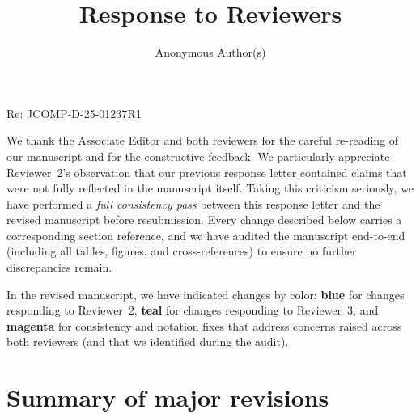 \documentclass{article}
\title{Response to Reviewers}
\author{Anonymous Author(s)}
\begin{document}
\maketitle

Re: JCOMP-D-25-01237R1

\medskip

We thank the Associate Editor and both reviewers for the careful re-reading of our manuscript and for the constructive feedback. We particularly appreciate Reviewer~2's observation that our previous response letter contained claims that were not fully reflected in the manuscript itself.
Taking this criticism seriously, we have performed a \emph{full consistency pass} between this response letter and the revised manuscript before resubmission. Every change described below carries a corresponding section reference, and we have audited the manuscript end-to-end (including all tables, figures, and cross-references) to ensure no further discrepancies remain.

In the revised manuscript, we have indicated changes by color:
{\color{blue}\textbf{blue}} for changes responding to Reviewer~2,
{\color{teal}\textbf{teal}} for changes responding to Reviewer~3, and
{\color{magenta}\textbf{magenta}} for consistency and notation fixes that
address concerns raised across both reviewers (and that we identified during
the audit).

\section*{Summary of major revisions}
\end{document}
